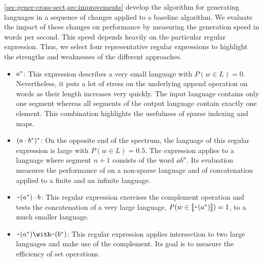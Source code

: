 \cref{sec:gener-cross-sect,sec:improvements} develop the algorithm for
generating languages in a sequence of changes applied to a baseline
algorithm. We evaluate the impact of these changes on performance by
measuring the generation speed in words per second. This speed depends
heavily on the particular regular expression. Thus, we select four
representative regular expressions to highlight the strengths and
weaknesses of the different approaches.
\begin{itemize}
\item $a^*$: This expression describes a very small language with $P (w\in L) = 0$.
  Nevertheless, it puts a lot of stress on the underlying
  append operation on words as their length increases very quickly.
  The input language contains only one segment whereas all segments of
  the output language contain exactly one element. This combination
  highlights the usefulness of sparse indexing and maps.
\item $(a \cdot{b^*})^*$: On the opposite end of the
  spectrum, the language of this regular expression is large
  with $P (w\in L)=0.5$. The expression applies  to a
  language where segment $n+1$ consists of the word $ab^n$. Its
  evaluation measures the performance of  on a non-sparse
  language and of {concatenation} applied to a finite and an infinite
  language.
\item $\texttt{\textasciitilde}{(a^*)} \cdot{b}$: This regular
  expression exercises the complement operation and tests the
  concatenation of a very large language, 
  $P (w\in \llbracket\texttt{\textasciitilde}{(a^*)}\rrbracket) = 1$, to a much smaller
  language.
\item $\Rintersect{\Rcomplement{(\Rstar{a})}}{\Rcomplement{(\Rstar{b})}}$:
  This regular expression applies {intersection} to two large languages
  and make use of the complement. Its goal is to measure the efficiency
  of set operations.
\end{itemize}

